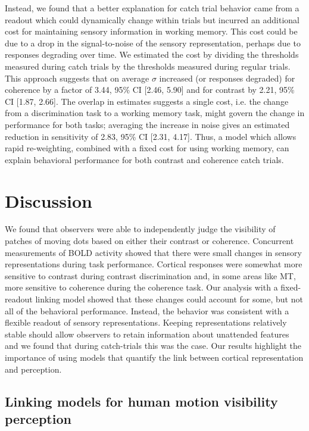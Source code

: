 \documentclass{report}
\begin{document}
Instead, we found that a better explanation for catch trial behavior came from a readout which could dynamically change within trials but incurred an additional cost for maintaining sensory information in working memory. This cost could be due to a drop in the signal-to-noise of the sensory representation, perhaps due to responses degrading over time. We estimated the cost by dividing the thresholds measured during catch trials by the thresholds measured during regular trials. This approach suggests that on average $\sigma$ increased (or responses degraded) for coherence by a factor of 3.44, 95\% CI [2.46, 5.90] and for contrast by 2.21, 95\% CI [1.87, 2.66]. The overlap in estimates suggests a single cost, i.e. the change from a discrimination task to a working memory task, might govern the change in performance for both tasks; averaging the increase in noise gives an estimated reduction in sensitivity of 2.83, 95\% CI [2.31, 4.17]. Thus, a model which allows rapid re-weighting, combined with a fixed cost for using working memory, can explain behavioral performance for both contrast and coherence catch trials.

\section{Discussion}

We found that observers were able to independently judge the visibility of patches of moving dots based on either their contrast or coherence. Concurrent measurements of BOLD activity showed that there were small changes in sensory representations during task performance. Cortical responses were somewhat more sensitive to contrast during contrast discrimination and, in some areas like MT, more sensitive to coherence during the coherence task. Our analysis with a fixed-readout linking model showed that these changes could account for some, but not all of the behavioral performance. Instead, the behavior was consistent with a flexible readout of sensory representations. Keeping representations relatively stable should allow observers to retain information about unattended features and we found that during catch-trials this was the case. Our results highlight the importance of using models that quantify the link between cortical representation and perception.

\subsection{Linking models for human motion visibility perception}
\end{document}
